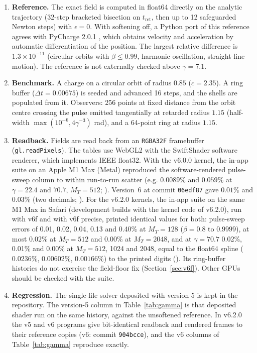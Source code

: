\documentclass[11pt, a4paper]{article}
\begin{document}
\begin{enumerate}
    \item \textbf{Reference.} The exact field is computed in float64 directly on the analytic trajectory (32-step bracketed bisection on $t_{\text{ret}}$, then up to 12 safeguarded Newton steps) with $\epsilon = 0$. With softening off, a Python port of this reference agrees with PyCharge 2.0.1 \cite{pycharge2022}, which obtains velocity and acceleration by automatic differentiation of the position. The largest relative difference is $1.3\times10^{-11}$ (circular orbits with $\beta \le 0.99$, harmonic oscillation, straight-line motion). The reference is not externally checked above $\gamma = 7.1$.
    \item \textbf{Benchmark.} A charge on a circular orbit of radius $0.85$ ($c = 2.35$). A ring buffer ($\Delta t = 0.00675$) is seeded and advanced 16 steps, and the shells are populated from it. Observers: 256 points at fixed distance from the orbit centre crossing the pulse emitted tangentially at retarded radius $1.15$ (half-width $\max(10^{-6}, 4\gamma^{-3})$ rad), and a 64-point ring at radius $1.15$.
    \item \textbf{Readback.} Fields are read back from an \texttt{RGBA32F} framebuffer (\texttt{gl.readPixels}). The tables use WebGL2 with the SwiftShader software renderer, which implements IEEE float32. With the v6.0.0 kernel, the in-app suite on an Apple M1 Max (Metal) reproduced the software-rendered pulse-sweep column to within run-to-run scatter (e.g. $0.0089\%$ and $0.059\%$ at $\gamma = 22.4$ and $70.7$, $M_T = 512$; ). Version~6 at commit \texttt{06edf87} gave $0.01\%$ and $0.03\%$ (two decimals; ). For the v6.2.0 kernels, the in-app suite on the same M1 Max in Safari (development builds with the kernel code of v6.2.0), run with v6f and with v6f precise, printed identical values for both: pulse-sweep errors of 0.01, 0.02, 0.04, 0.13 and 0.40\% at $M_T = 128$ ($\beta = 0.8$ to $0.9999$), at most 0.02\% at $M_T = 512$ and 0.00\% at $M_T = 2048$, and at $\gamma = 70.7$ 0.02\%, 0.01\% and 0.00\% at $M_T = 512$, 1024 and 2048, equal to the float64 spline ($0.0236\%$, $0.00602\%$, $0.00166\%$) to the printed digits (). Its ring-buffer histories do not exercise the field-floor fix (Section~\ref{sec:v6f}). Other GPUs should be checked with the suite.
    \item \textbf{Regression.} The single-file solver deposited with version 5 is kept in the repository. The version-5 column in Table~\ref{tab:gamma} is that deposited shader run on the same history, against the unsoftened reference. In v6.2.0 the v5 and v6 programs give bit-identical readback and rendered frames to their reference copies (v6: commit \texttt{904bcce}), and the v6 columns of Table~\ref{tab:gamma} reproduce  exactly.
\end{enumerate}
\end{document}
